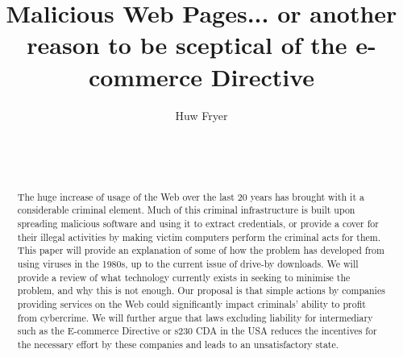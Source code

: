 \documentclass{acm_proc_article-sp}
\begin{document}
\title{Malicious Web Pages... or another reason to be sceptical of the e-commerce Directive}
\author{
\alignauthor
Huw Fryer\\
       \\
       \\
       \\
}
\maketitle
\begin{abstract}
The huge increase of usage of the Web over the last 20 years has brought with it a considerable criminal element.  Much of this criminal infrastructure is built upon spreading malicious software and using it to extract credentials, or provide a cover for their illegal activities by making victim computers perform the criminal acts for them.  This paper will provide an explanation of some of how the problem has developed from using viruses in the 1980s, up to the current issue of drive-by downloads.  We will provide a review of what technology currently exists in seeking to minimise the problem, and why this is not enough.  Our proposal is that simple actions by companies providing services on the Web could significantly impact criminals' ability to profit from cybercrime.  We will further argue that laws excluding liability for intermediary such as the E-commerce Directive or s230 CDA in the USA reduces the incentives for the necessary effort by these companies and leads to an unsatisfactory state.



\end{abstract}
\end{document}
